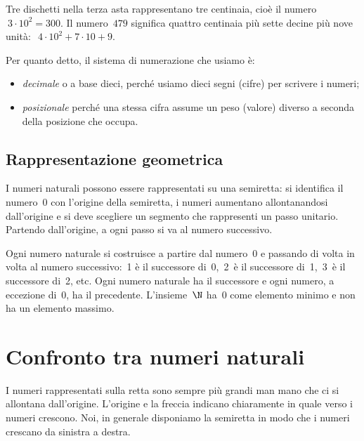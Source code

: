 Tre dischetti nella terza asta rappresentano tre centinaia, 
cioè il numero~\(~3 \cdot 10^2=300\).
Il numero~\(479\) significa quattro centinaia più sette decine più 
nove unità:~\(~4 \cdot 10^2 + 7 \cdot 10 + 9\).

Per quanto detto, il sistema di numerazione che usiamo è:

\begin{itemize} [noitemsep]
 \item \emph{decimale} o a base dieci, 
  perché usiamo dieci segni (cifre) per scrivere i numeri;
 \item \emph{posizionale} 
  perché una stessa cifra assume un peso (valore) diverso a seconda della 
  posizione che occupa.
\end{itemize}

\subsection{Rappresentazione geometrica}
I numeri naturali possono essere rappresentati su una semiretta: 
si identifica il numero~0 con l'origine della semiretta, 
i numeri aumentano allontanandosi dall'origine e si deve scegliere un 
segmento che rappresenti un passo unitario.
Partendo dall'origine, a ogni passo si va al numero successivo.

\begin{inaccessibleblock}
\begin{center}
\natrappgeo
\end{center}
\end{inaccessibleblock}

\vspace{-.5em}
Ogni numero naturale si costruisce a partire dal numero~0 e passando di 
volta in volta al numero successivo:~1 è il successore di~0,~2~è il 
successore di~1,~3~è il successore di~2, etc. 
Ogni numero naturale ha il successore e ogni numero, a eccezione di~0, ha il
precedente. 
L'insieme~\(\N\) ha~0 come elemento minimo e non ha un elemento massimo.

\section{Confronto tra numeri naturali}
\label{sec:nat_operazioni}

I numeri rappresentati sulla retta sono sempre più grandi man mano che ci 
si allontana dall'origine. 
L'origine e la freccia indicano chiaramente in quale verso i numeri 
crescono. Noi, in generale disponiamo la semiretta in modo che i numeri 
crescano da sinistra a destra.

